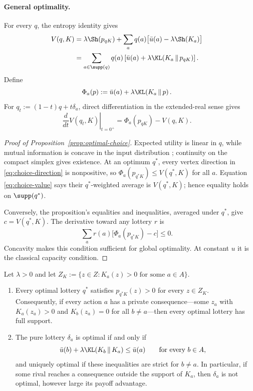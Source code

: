 \paragraph{General optimality.}
For every $q$, the entropy identity gives
\begin{equation}\label{eq:choice-value}
 \begin{aligned}
 V(q,K)
 &=\lambda\Sh(p_{qK})
   +\sum_aq(a)\bigl[\bar u(a)-\lambda\Sh(K_a)\bigr] \\
 &=\sum_{a\in\supp(q)}q(a)
   \left[\bar u(a)+\lambda
   \KL\!\left(K_a\,\middle\|\,p_{qK}\right)\right].
 \end{aligned}
\end{equation}
Define
\[
 \Phi_a(p):=\bar u(a)+\lambda\KL\!\left(K_a\,\middle\|\,p\right).
\]
For $q_t:=(1-t)q+t\delta_a$, direct differentiation in the extended-real
sense gives
\begin{equation}\label{eq:choice-direction}
 \left.\frac{d}{dt}V(q_t,K)\right|_{t=0^+}
 =\Phi_a(p_{qK})-V(q,K).
\end{equation}

\begin{proof}[Proof of Proposition~\ref{prop:optimal-choice}]
Expected utility is linear in $q$, while mutual information is concave in
the input distribution \cite{CoverThomas2006}; continuity on the compact
simplex gives existence.  At an optimum $q^*$, every vertex direction in
\eqref{eq:choice-direction} is nonpositive, so
$\Phi_a(p_{q^*K})\le V(q^*,K)$ for all $a$.  Equation
\eqref{eq:choice-value} says their $q^*$-weighted average is $V(q^*,K)$;
hence equality holds on $\supp(q^*)$.

Conversely, the proposition's equalities and inequalities, averaged under
$q^*$, give $c=V(q^*,K)$.  The derivative toward any lottery $r$ is
\[
 \sum_a r(a)\bigl[\Phi_a(p_{q^*K})-c\bigr]\le0.
\]
Concavity makes this condition sufficient for global optimality.  At
constant $u$ it is the classical capacity condition.
\end{proof}

\begin{proposition}\label{cor:support-pure}
Let $\lambda>0$ and let
$Z_K:=\{z\in Z:K_a(z)>0\text{ for some }a\in A\}$.
\begin{enumerate}[label=\textup{(\roman*)},leftmargin=*]
\item Every optimal lottery $q^*$ satisfies $p_{q^*K}(z)>0$ for every
$z\in Z_K$.  Consequently, if every action $a$ has a private
consequence---some $z_a$ with $K_a(z_a)>0$ and $K_b(z_a)=0$ for all
$b\ne a$---then every optimal lottery has full support.
\item The pure lottery $\delta_a$ is optimal if and only if
\[
 \bar u(b)+\lambda\KL\!\left(K_b\,\middle\|\,K_a\right)
 \le \bar u(a)
 \qquad\text{for every }b\in A,
\]
and uniquely optimal if these inequalities are strict for $b\ne a$.  In
particular, if some rival reaches a consequence outside the support of
$K_a$, then $\delta_a$ is not optimal, however large its payoff advantage.
\end{enumerate}
\end{proposition}

